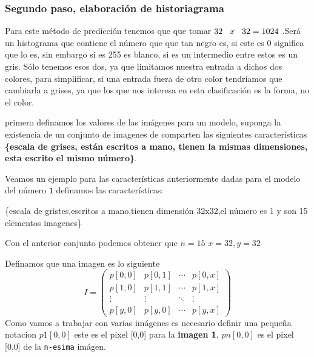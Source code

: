 \documentclass[
  spanish,
]{article}
\begin{document}
\hypertarget{segundo-paso-elaboraciuxf3n-de-historiagrama}{%
\subsubsection{Segundo paso, elaboración de
historiagrama}\label{segundo-paso-elaboraciuxf3n-de-historiagrama}}

Para este método de predicción tenemos que que tomar
\(32 \hspace{0.3cm}x \hspace{0.3cm} 32=1024\) .Será un histograma que
contiene el número que que tan negro es, si este es 0 significa que lo
es, sin embargo si es 255 es blanco, si es un intermedio entre estos es
un gris. Sólo tenemos esos dos, ya que limitamos nuestra entrada a
dichos dos colores, para simplificar, si una entrada fuera de otro color
tendríamos que cambiarla a grises, ya que los que nos interesa en esta
clasificación es la forma, no el color.

primero definamos los valores de las imágenes para un modelo, suponga la
existencia de un conjunto de imagenes de comparten las siguientes
características \textbf{\{escala de grises, están escritos a mano,
tienen la mismas dimensiones, esta escrito el mismo número\}}.

Veamos un ejemplo para las características anteriormente dadas para el
modelo del número \texttt{1} definamos las características:

\{escala de gristes,escritos a mano,tienen dimensión 32x32,el número es
1 y son 15 elementos imagenes\}

Con el anterior conjunto podemos obtener que \(n=15\) \(x=32,y=32\)

Definamos que una imagen es lo siguiente \[
I=
\begin{equation}
\begin{pmatrix}
p[0,0] & p[0,1] & \cdots & p[0,x]\\
p[1,0] & p[1,1] & \cdots & p[1,x]\\
\vdots & \vdots & \ddots & \vdots\\
p[y,0] & p[y,0] & \cdots & p[y,x]
\end{pmatrix}
\end{equation}
\] Como vamos a trabajar con varias imágenes es necesario definir una
pequeña notacion \(p1[0,0]\) este es el pixel {[}0,0{]} para la
\textbf{imagen 1}, \(pn[0,0]\) es el pixel {[}0,0{]} de la
\texttt{n-esima} imágen.
\end{document}
